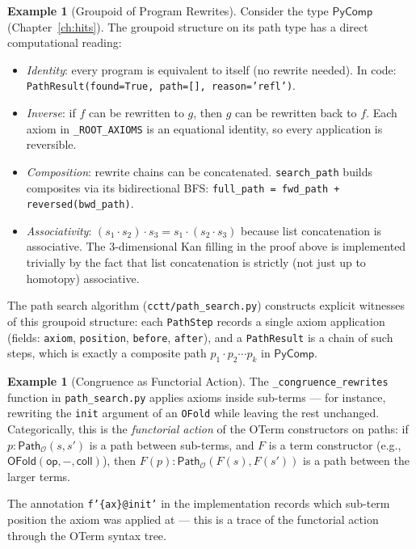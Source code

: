\documentclass[11pt,a4paper]{report}
\theoremstyle{definition}
\newtheorem{example}[definition]{Example}
\theoremstyle{plain}
\newcommand{\Path}{\mathsf{Path}}
\begin{document}
\begin{example}[Groupoid of Program Rewrites]
\label{ex:rewrite-groupoid}
Consider the type $\mathsf{PyComp}$ (Chapter~\ref{ch:hits}).  The groupoid
structure on its path type has a direct computational reading:
\begin{itemize}
  \item \emph{Identity}: every program is equivalent to itself
    (no rewrite needed).  In code: \texttt{PathResult(found=True,
    path=[], reason='refl')}.
  \item \emph{Inverse}: if $f$ can be rewritten to $g$, then $g$ can be
    rewritten back to $f$.  Each axiom in \texttt{\_ROOT\_AXIOMS} is
    an equational identity, so every application is reversible.
  \item \emph{Composition}: rewrite chains can be concatenated.
    \texttt{search\_path} builds composites via its bidirectional
    BFS: \texttt{full\_path = fwd\_path + reversed(bwd\_path)}.
  \item \emph{Associativity}: $(s_1 \cdot s_2) \cdot s_3 = s_1 \cdot
    (s_2 \cdot s_3)$ because list concatenation is associative.
    The 3-dimensional Kan filling in the proof above is implemented
    trivially by the fact that list concatenation is strictly (not just
    up to homotopy) associative.
\end{itemize}
The path search algorithm (\texttt{cctt/path\_search.py}) constructs
explicit witnesses of this groupoid structure: each \texttt{PathStep}
records a single axiom application (fields: \texttt{axiom},
\texttt{position}, \texttt{before}, \texttt{after}), and a
\texttt{PathResult} is a chain of such steps, which is exactly a
composite path $p_1 \cdot p_2 \cdots p_k$ in $\mathsf{PyComp}$.
\end{example}

\begin{example}[Congruence as Functorial Action]
\label{ex:congruence-functorial}
The \texttt{\_congruence\_rewrites} function in \texttt{path\_search.py}
applies axioms inside sub-terms --- for instance, rewriting the
\texttt{init} argument of an \texttt{OFold} while leaving the rest
unchanged.  Categorically, this is the \emph{functorial action} of the
OTerm constructors on paths: if $p : \Path_\mathcal{O}(s, s')$ is a
path between sub-terms, and $F$ is a term constructor (e.g.,
$\mathsf{OFold}(\mathsf{op}, -, \mathsf{coll})$), then
$F(p) : \Path_\mathcal{O}(F(s), F(s'))$ is a path between the larger
terms.

The annotation \texttt{f'\{ax\}@init'} in the implementation records
which sub-term position the axiom was applied at --- this is a trace
of the functorial action through the OTerm syntax tree.
\end{example}
\end{document}
